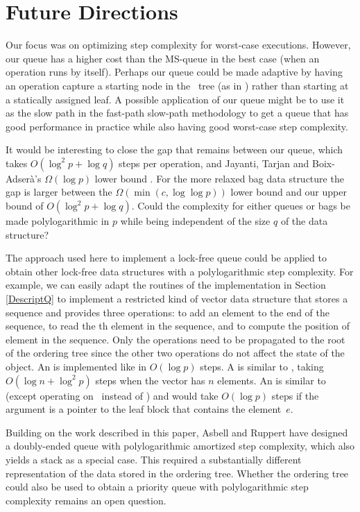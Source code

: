 
\section{Future Directions}

Our focus was on optimizing step complexity for worst-case executions.
However, our queue has a higher cost than the MS-queue in the best case (when an operation
runs by itself).
Perhaps our queue could be made adaptive by having an operation capture a starting node
in the \ordering\ tree (as in \cite{DBLP:conf/stoc/AfekDT95}) rather than starting at a statically assigned leaf.
A possible application of our queue  might be to use it as the slow path in the
fast-path slow-path methodology  \cite{10.1145/2370036.2145835} to
get a queue that has good performance in practice while also having good worst-case step complexity.

It would be interesting to close the gap that remains between our queue, which takes $O(\log^2 p + \log q)$ steps per operation,
and Jayanti, Tarjan and Boix-Adser\`{a}'s $\Omega(\log p)$ lower bound \cite{JTB19}.
For the more relaxed bag data structure the gap is larger between the  $\Omega(\min(c,\log\log p))$ lower bound \cite{DBLP:conf/opodis/AttiyaF17} and our upper bound of $O(\log^2 p + \log q)$.
Could the complexity for either queues or bags be made polylogarithmic in $p$ while being independent of the size $q$ of the data structure?

The approach used here to implement a lock-free queue 
could be applied to obtain other lock-free
data structures with a polylogarithmic step complexity.
For example, we can easily adapt the routines of the implementation in Section \ref{DescriptQ} 
to implement a restricted kind of vector data structure that stores a sequence and
provides three operations:  to add an element  to the end of the sequence,
 to read the th element in the sequence, and
 to compute the position of element  in the sequence.
Only the  operations need to be propagated to the root of the ordering tree
since the other two operations do not affect the state of the object.
An  is implemented like  in $O(\log p)$ steps.  
A  is similar to , taking $O(\log n + \log^2p)$ steps when the vector has $n$ elements.  
An  is similar to  (except operating on \enqueues\ instead of \dequeues) and would take $O(\log p)$ steps if the argument is a pointer to the leaf block that contains the element~$e$.

Building on the work described in this paper, Asbell and Ruppert \cite{AR23} have
designed a doubly-ended queue with polylogarithmic amortized step
complexity, which also yields a stack as a special case.  
This required a substantially different representation of the data stored in the ordering tree.
Whether the ordering tree could also be used to obtain a priority queue with polylogarithmic step complexity
remains an open question.

